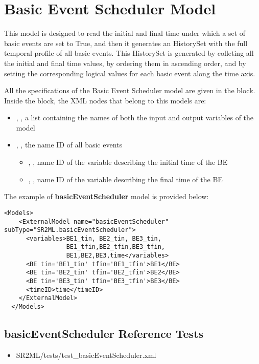 \section{Basic Event Scheduler Model}
\label{sec:basicEventScheduler}

This model is designed to read the initial and final time under which a set of basic events
are set to True, and then it generates an HistorySet with the full temporal profile of all
basic events.
This HistorySet is generated by colleting all the initial and final time values, by ordering 
them in ascending order, and by setting the corresponding logical values for each basic event 
along the time axis.


All the specifications of the Basic Event Scheduler model are given in the  block.
Inside the  block, the XML
nodes that belong to this models are:
\begin{itemize}
  \item  {}, , a list containing the names of both the input and output variables of the model
  \item  {}, , the name ID of all basic events
	  \begin{itemize}
	    \item {}, , name ID of the variable describing the initial time of the BE
	    \item {}, , name ID of the variable describing the final time of the BE
	  \end{itemize}
\end{itemize}

The example of \textbf{basicEventScheduler} model is provided below:
\begin{lstlisting}[style=XML]
  <Models>
    <ExternalModel name="basicEventScheduler" subType="SR2ML.basicEventScheduler">
      <variables>BE1_tin, BE2_tin, BE3_tin,
                 BE1_tfin,BE2_tfin,BE3_tfin,
                 BE1,BE2,BE3,time</variables>
      <BE tin='BE1_tin' tfin='BE1_tfin'>BE1</BE>
      <BE tin='BE2_tin' tfin='BE2_tfin'>BE2</BE>
      <BE tin='BE3_tin' tfin='BE3_tfin'>BE3</BE>
      <timeID>time</timeID>
    </ExternalModel>
  </Models>
\end{lstlisting}

\subsection{basicEventScheduler Reference Tests}
\begin{itemize}
	\item SR2ML/tests/test\_basicEventScheduler.xml
\end{itemize}


